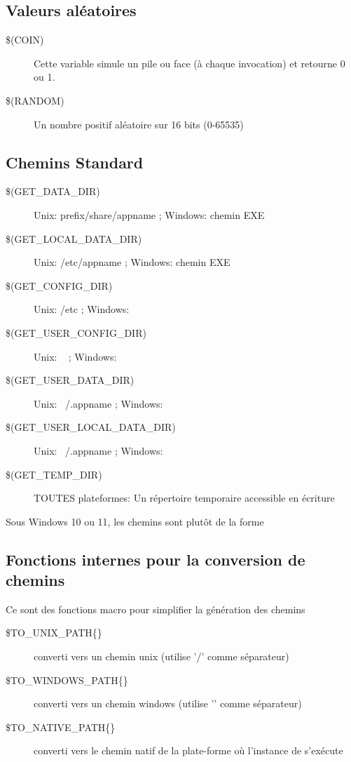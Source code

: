 \subsection{Valeurs aléatoires}

\begin{description}
\item[{\footnotesize \$(COIN)}] Cette variable simule un pile ou face (à chaque invocation) et retourne 0 ou 1.
\item[{\footnotesize \$(RANDOM)}] Un nombre positif aléatoire sur 16 bits (0-65535)
\end{description}

\subsection{Chemins Standard}

\begin{description}
\item[{\footnotesize \$(GET\_DATA\_DIR)}] Unix: prefix/share/appname ; Windows: chemin EXE
\item[{\footnotesize \$(GET\_LOCAL\_DATA\_DIR)}] Unix: /etc/appname ; Windows: chemin EXE
\item[{\footnotesize \$(GET\_CONFIG\_DIR)}] Unix: /etc ; Windows: 
\item[{\footnotesize \$(GET\_USER\_CONFIG\_DIR)}] Unix: ~ ; Windows: 
\item[{\footnotesize \$(GET\_USER\_DATA\_DIR)}] Unix: ~/.appname ; Windows: 
\item[{\footnotesize \$(GET\_USER\_LOCAL\_DATA\_DIR)}] Unix: ~/.appname ; Windows: 
\item[{\footnotesize \$(GET\_TEMP\_DIR)}] TOUTES plateformes: Un répertoire temporaire accessible en écriture
\end{description}
Sous Windows 10 ou 11, les chemins sont plutôt de la forme 

\subsection{Fonctions internes pour la conversion de chemins}
Ce sont des fonctions macro pour simplifier la génération des chemins 
\begin{description}
\item[{\footnotesize \$TO\_UNIX\_PATH\{\}}] converti vers un chemin unix (utilise '/' comme séparateur)
\item[{\footnotesize \$TO\_WINDOWS\_PATH\{\}}] converti vers un chemin windows (utilise '\osp' comme séparateur)
\item[{\footnotesize \$TO\_NATIVE\_PATH\{\}}] converti vers le chemin natif de la plate-forme où l'instance de \codeblocks s'exécute
\end{description}

